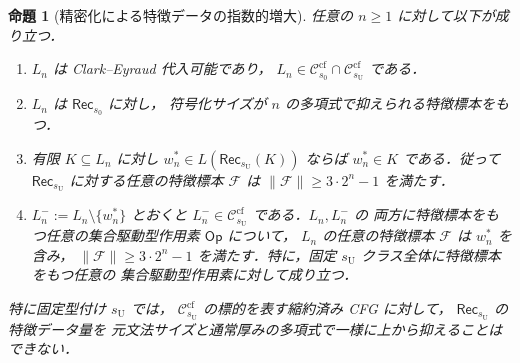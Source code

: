 \documentclass[11pt,a4paper]{ltjsarticle}
\newtheorem{proposition}[theorem]{命題}
\theoremstyle{remark}
\theoremstyle{plain}
\newcommand{\cf}{\mathrm{cf}}
\newcommand{\Ccf}[1]{\mathcal C_{#1}^{\cf}}
\begin{document}
\begin{proposition}[精密化による特徴データの指数的増大]
\label{prop:typed-thickness-gap}
任意の $n\ge1$ に対して以下が成り立つ．
\begin{enumerate}[label=\textup{(\roman*)},nosep]
\item $L_n$ は Clark--Eyraud 代入可能であり，
$L_n\in\Ccf{s_0}\cap\Ccf{s_{\mathrm U}}$ である．
\item $L_n$ は $\mathsf{Rec}_{s_0}$ に対し，
符号化サイズが $n$ の多項式で抑えられる特徴標本をもつ．
\item 有限 $K\subseteq L_n$ に対し
$w^*_n\in L(\mathsf{Rec}_{s_{\mathrm U}}(K))$ ならば
$w^*_n\in K$ である．従って
$\mathsf{Rec}_{s_{\mathrm U}}$ に対する任意の特徴標本 $\mathcal F$ は
$\|\mathcal F\|\ge3\cdot2^n-1$ を満たす．
\item $L^-_n:=L_n\setminus\{w_n^*\}$ とおくと
$L^-_n\in\Ccf{s_{\mathrm U}}$ である．$L_n,L^-_n$ の
両方に特徴標本をもつ任意の集合駆動型作用素 $\mathsf{Op}$ について，
$L_n$ の任意の特徴標本 $\mathcal F$ は $w_n^*$ を含み，
$\|\mathcal F\|\ge3\cdot2^n-1$ を満たす．特に，固定
$s_{\mathrm U}$ クラス全体に特徴標本をもつ任意の
集合駆動型作用素に対して成り立つ．
\end{enumerate}
特に固定型付け $s_{\mathrm U}$ では，
$\Ccf{s_{\mathrm U}}$ の標的を表す縮約済み CFG に対して，
$\mathsf{Rec}_{s_{\mathrm U}}$ の特徴データ量を
元文法サイズと通常厚みの多項式で一様に上から抑えることはできない．
\end{proposition}
\end{document}
